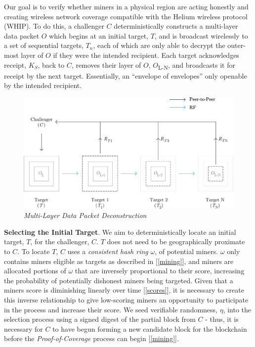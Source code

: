 \documentclass[letterpaper,11pt]{article}
\begin{document}
Our goal is to verify whether miners in a physical region are acting honestly and creating wireless network coverage compatible with the Helium wireless protocol (WHIP). To do this, a challenger $C$ deterministically constructs a multi-layer data packet $O$ which begins at an initial target, $T$, and is broadcast wirelessly to a set of sequential targets, $T_n$, each of which are only able to decrypt the outer-most layer of $O$ if they were the intended recipient. Each target acknowledges receipt, $K_S$, back to $C$, removes their layer of $O$, $O$\textsubscript{L-N}, and broadcasts it for receipt by the next target. Essentially, an ``envelope of envelopes'' only openable by the intended recipient.

\begin{figure}[H]
    \begin{center}
          \includegraphics[width=\textwidth]{diagram2.eps}
          \caption{\emph{Multi-Layer Data Packet Deconstruction}}
          \label{fig:poc-construction}
     \end{center}
\end{figure}

\textbf{Selecting the Initial Target}. We aim to deterministically locate an initial target, $T$, for the challenger, $C$. $T$ does not need to be geographically proximate to $C$. To locate $T$, $C$ uses a \emph{consistent hash ring} $\omega$, of potential miners. $\omega$ only contains miners eligible as targets as described in [\ref{mining}], and miners are allocated portions of $\omega$ that are inversely proportional to their score, increasing the probability of potentially dishonest miners being targeted. Given that a miners score is diminishing linearly over time [\ref{scores}], it is necessary to create this inverse relationship to give low-scoring miners an opportunity to participate in the process and increase their score. We seed verifiable randomness, $\eta$, into the selection process using a signed digest of the partial block from $C$ - thus, it is necessary for $C$ to have begun forming a new candidate block for the blockchain before the \emph{Proof-of-Coverage} process can begin [\ref{mining}].
\end{document}
